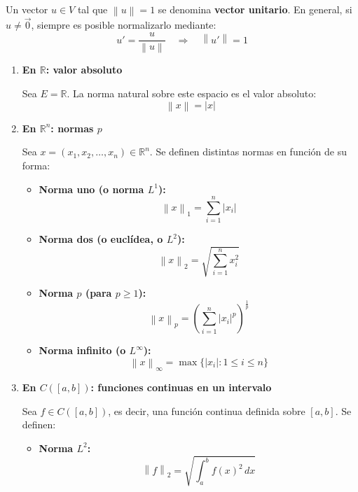 Un vector \(u \in V\) tal que \(\left\lVert u \right\rVert = 1\) se denomina \textbf{vector unitario}. En general, si \(u \neq \vec{0}\), siempre es posible normalizarlo mediante:
\[
u' = \frac{u}{\left\lVert u \right\rVert} \quad \Rightarrow \quad \left\lVert u' \right\rVert = 1
\]

\noindent {}
\begin{enumerate}

  \item \textbf{En \(\mathbb{R}\): valor absoluto}

  Sea \(E = \mathbb{R}\). La norma natural sobre este espacio es el valor absoluto:
  \[
    \left\lVert x \right\rVert = |x|
  \]

  \item \textbf{En \(\mathbb{R}^n\): normas \(p\)}

  Sea \(x = (x_1, x_2, \dots, x_n) \in \mathbb{R}^n\). Se definen distintas normas en función de su forma:

  \begin{itemize}
    \item \textbf{Norma uno (o norma \(L^1\)):}
    \[
      \left\lVert x \right\rVert_1 = \sum_{i=1}^{n} |x_i|
    \]

    \item \textbf{Norma dos (o euclídea, o \(L^2\)):}
    \[
      \left\lVert x \right\rVert_2 = \sqrt{\sum_{i=1}^{n} x_i^2}
    \]

    \item \textbf{Norma \(p\) (para \(p \geq 1\)):}
    \[
      \left\lVert x \right\rVert_p = \left( \sum_{i=1}^{n} |x_i|^p \right)^{\frac{1}{p}}
    \]

    \item \textbf{Norma infinito (o \(L^\infty\)):}
    \[
      \left\lVert x \right\rVert_\infty = \max \{ |x_i| : 1 \leq i \leq n \}
    \]
  \end{itemize}

  \item \textbf{En \(C([a,b])\): funciones continuas en un intervalo}

  Sea \(f \in C([a,b])\), es decir, una función continua definida sobre \([a,b]\). Se definen:

  \begin{itemize}
    \item \textbf{Norma \(L^2\):}
    \[
      \left\lVert f \right\rVert_2 = \sqrt{ \int_a^b f(x)^2 \, dx }
    \]


\end{itemize}
\end{enumerate}
